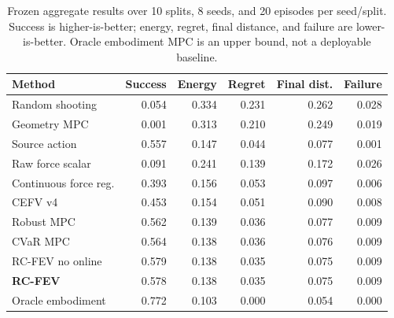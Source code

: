 
\begin{table}[t]
\centering
\small
\caption{Frozen aggregate results over 10 splits, 8 seeds, and 20 episodes per seed/split. Success is higher-is-better; energy, regret, final distance, and failure are lower-is-better. Oracle embodiment MPC is an upper bound, not a deployable baseline.}
\label{tab:aggregate}
\begin{tabular}{lrrrrr}
\toprule
Method & Success & Energy & Regret & Final dist. & Failure \\
\midrule
Random shooting & 0.054 & 0.334 & 0.231 & 0.262 & 0.028 \\
Geometry MPC & 0.001 & 0.313 & 0.210 & 0.249 & 0.019 \\
Source action & 0.557 & 0.147 & 0.044 & 0.077 & 0.001 \\
Raw force scalar & 0.091 & 0.241 & 0.139 & 0.172 & 0.026 \\
Continuous force reg. & 0.393 & 0.156 & 0.053 & 0.097 & 0.006 \\
CEFV v4 & 0.453 & 0.154 & 0.051 & 0.090 & 0.008 \\
Robust MPC & 0.562 & 0.139 & 0.036 & 0.077 & 0.009 \\
CVaR MPC & 0.564 & 0.138 & 0.036 & 0.076 & 0.009 \\
RC-FEV no online & 0.579 & 0.138 & 0.035 & 0.075 & 0.009 \\
\textbf{RC-FEV} & 0.578 & 0.138 & 0.035 & 0.075 & 0.009 \\
Oracle embodiment & 0.772 & 0.103 & 0.000 & 0.054 & 0.000 \\
\bottomrule
\end{tabular}
\end{table}


